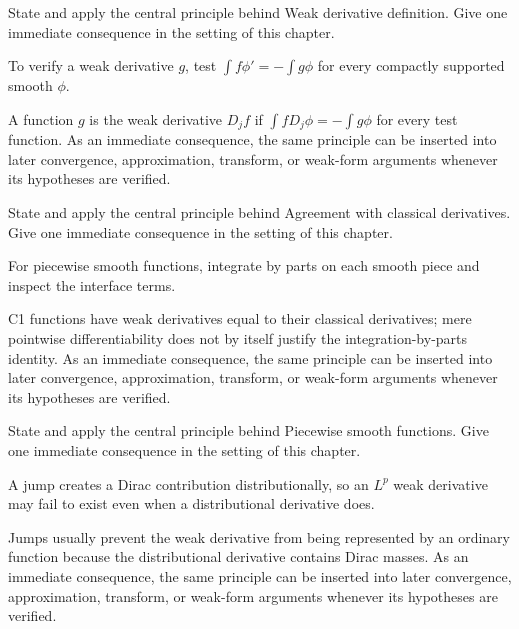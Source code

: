 \begin{exercise}\label{exr:iii20-01}
State and apply the central principle behind Weak derivative definition. Give one immediate consequence in the setting of this chapter.
\end{exercise}
\begin{hint}
To verify a weak derivative \(g\), test \(\int f\phi'=-\int g\phi\) for every compactly supported smooth \(\phi\).
\end{hint}
\begin{solution}
A function $g$ is the weak derivative $D_jf$ if $\int fD_j\phi=-\int g\phi$ for every test function. As an immediate consequence, the same principle can be inserted into later convergence, approximation, transform, or weak-form arguments whenever its hypotheses are verified.
\end{solution}

\begin{exercise}\label{exr:iii20-02}
State and apply the central principle behind Agreement with classical derivatives. Give one immediate consequence in the setting of this chapter.
\end{exercise}
\begin{hint}
For piecewise smooth functions, integrate by parts on each smooth piece and inspect the interface terms.
\end{hint}
\begin{solution}
C1 functions have weak derivatives equal to their classical derivatives; mere pointwise differentiability does not by itself justify the integration-by-parts identity. As an immediate consequence, the same principle can be inserted into later convergence, approximation, transform, or weak-form arguments whenever its hypotheses are verified.
\end{solution}

\begin{exercise}\label{exr:iii20-03}
State and apply the central principle behind Piecewise smooth functions. Give one immediate consequence in the setting of this chapter.
\end{exercise}
\begin{hint}
A jump creates a Dirac contribution distributionally, so an \(L^p\) weak derivative may fail to exist even when a distributional derivative does.
\end{hint}
\begin{solution}
Jumps usually prevent the weak derivative from being represented by an ordinary function because the distributional derivative contains Dirac masses. As an immediate consequence, the same principle can be inserted into later convergence, approximation, transform, or weak-form arguments whenever its hypotheses are verified.
\end{solution}

